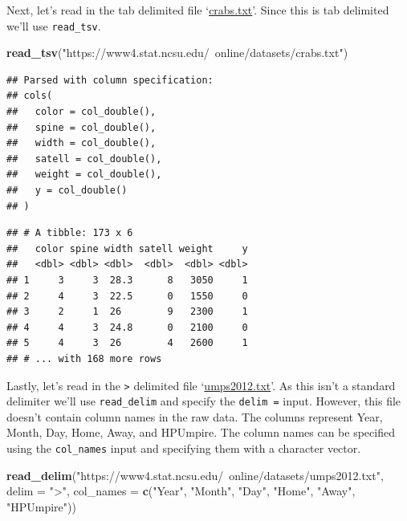 \documentclass[
]{book}
\newenvironment{Shaded}{\begin{snugshade}}{\end{snugshade}}
\newcommand{\DataTypeTok}[1]{\textcolor[rgb]{0.13,0.29,0.53}{#1}}
\newcommand{\KeywordTok}[1]{\textcolor[rgb]{0.13,0.29,0.53}{\textbf{#1}}}
\newcommand{\NormalTok}[1]{#1}
\newcommand{\StringTok}[1]{\textcolor[rgb]{0.31,0.60,0.02}{#1}}
\theoremstyle{definition}
\theoremstyle{definition}
\theoremstyle{definition}
\theoremstyle{remark}
\begin{document}
Next, let's read in the tab delimited file `\href{https://www4.stat.ncsu.edu/~online/datasets/crabs.txt}{crabs.txt}'. Since this is tab delimited we'll use \texttt{read\_tsv}.

\begin{Shaded}
\begin{Highlighting}[]
\KeywordTok{read_tsv}\NormalTok{(}\StringTok{"https://www4.stat.ncsu.edu/~online/datasets/crabs.txt"}\NormalTok{)}
\end{Highlighting}
\end{Shaded}

\begin{verbatim}
## Parsed with column specification:
## cols(
##   color = col_double(),
##   spine = col_double(),
##   width = col_double(),
##   satell = col_double(),
##   weight = col_double(),
##   y = col_double()
## )
\end{verbatim}

\begin{verbatim}
## # A tibble: 173 x 6
##   color spine width satell weight     y
##   <dbl> <dbl> <dbl>  <dbl>  <dbl> <dbl>
## 1     3     3  28.3      8   3050     1
## 2     4     3  22.5      0   1550     0
## 3     2     1  26        9   2300     1
## 4     4     3  24.8      0   2100     0
## 5     4     3  26        4   2600     1
## # ... with 168 more rows
\end{verbatim}

Lastly, let's read in the \texttt{\textgreater{}} delimited file `\href{https://www4.stat.ncsu.edu/~online/datasets/umps2012.txt}{umps2012.txt}'. As this isn't a standard delimiter we'll use \texttt{read\_delim} and specify the \texttt{delim\ =} input. However, this file doesn't contain column names in the raw data. The columns represent Year, Month, Day, Home, Away, and HPUmpire. The column names can be specified using the \texttt{col\_names} input and specifying them with a character vector.

\begin{Shaded}
\begin{Highlighting}[]
\KeywordTok{read_delim}\NormalTok{(}\StringTok{"https://www4.stat.ncsu.edu/~online/datasets/umps2012.txt"}\NormalTok{, }\DataTypeTok{delim =} \StringTok{">"}\NormalTok{,}
           \DataTypeTok{col_names =} \KeywordTok{c}\NormalTok{(}\StringTok{"Year"}\NormalTok{, }\StringTok{"Month"}\NormalTok{, }\StringTok{"Day"}\NormalTok{, }\StringTok{"Home"}\NormalTok{, }\StringTok{"Away"}\NormalTok{, }\StringTok{"HPUmpire"}\NormalTok{))}
\end{Highlighting}
\end{Shaded}
\end{document}

